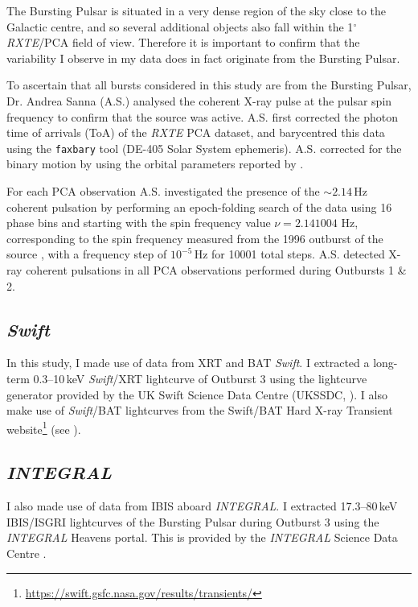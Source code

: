\par The Bursting Pulsar is situated in a very dense region of the sky close to the Galactic centre, and so several additional objects also fall within the 1$^\circ$ \textit{RXTE}/PCA field of view.  Therefore it is important to confirm that the variability I observe in my data does in fact originate from the Bursting Pulsar.
\par To ascertain that all bursts considered in this study are from the Bursting Pulsar, Dr. Andrea Sanna (\textsf{A.S.}) analysed the coherent X-ray pulse at the pulsar spin frequency to confirm that the source was active.  \textsf{A.S.} first corrected the photon time of arrivals (ToA) of the \textit{RXTE} PCA dataset, and barycentred this data using the \texttt{faxbary} tool (DE-405 Solar System ephemeris).  \textsf{A.S.} corrected for the binary motion by using the orbital parameters reported by \citet{Finger_Pulse}.
\par For each PCA observation \textsf{A.S.} investigated the presence of the $\sim 2.14$\,Hz coherent pulsation by performing an epoch-folding search of the data using 16 phase bins and starting with the spin frequency value $\nu=2.141004$ Hz, corresponding to the spin frequency measured from the 1996 outburst of the source \citep{Finger_Pulse}, with a frequency step of $10^{-5}$\,Hz for 10001 total steps. \textsf{A.S.} detected X-ray coherent pulsations in all PCA observations performed during Outbursts 1 \& 2.

\subsection{\textit{Swift}}
\par In this study, I made use of data from XRT and BAT \textit{Swift}.  I extracted a long-term 0.3--10\,keV \textit{Swift}/XRT lightcurve of Outburst 3 using the lightcurve generator provided by the UK Swift Science Data Centre (UKSSDC, \citealp{Evans_Swift1}).  I also make use of \textit{Swift}/BAT lightcurves from the Swift/BAT Hard X-ray Transient website\footnote{\url{https://swift.gsfc.nasa.gov/results/transients/}} (see \citealp{Krimm_BAT}).

\subsection{\textit{INTEGRAL}}

\par I also made use of data from IBIS aboard \textit{INTEGRAL}.  I extracted 17.3--80\,keV IBIS/ISGRI lightcurves of the Bursting Pulsar during Outburst 3 using the \textit{INTEGRAL} Heavens portal.  This is provided by the \textit{INTEGRAL} Science Data Centre \citep{Lubinski_Heavens}.

